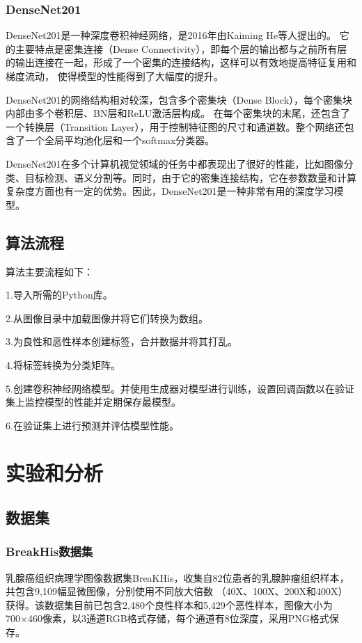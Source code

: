 \documentclass[AutoFakeBold]{LZUThesis}
\begin{document}
\subsection{DenseNet201}
DenseNet201是一种深度卷积神经网络，是2016年由Kaiming He等人提出的。
它的主要特点是密集连接（Dense Connectivity），即每个层的输出都与之前所有层的输出连接在一起，形成了一个密集的连接结构，这样可以有效地提高特征复用和梯度流动，
使得模型的性能得到了大幅度的提升。

DenseNet201的网络结构相对较深，包含多个密集块（Dense Block），每个密集块内部由多个卷积层、BN层和ReLU激活层构成。
在每个密集块的末尾，还包含了一个转换层（Transition Layer），用于控制特征图的尺寸和通道数。整个网络还包含了一个全局平均池化层和一个softmax分类器。

DenseNet201在多个计算机视觉领域的任务中都表现出了很好的性能，比如图像分类、目标检测、语义分割等。同时，由于它的密集连接结构，它在参数数量和计算复杂度方面也有一定的优势。因此，DenseNet201是一种非常有用的深度学习模型。


\section{算法流程}

算法主要流程如下：

1.导入所需的Python库。

2.从图像目录中加载图像并将它们转换为数组。

3.为良性和恶性样本创建标签，合并数据并将其打乱。

4.将标签转换为分类矩阵。

5.创建卷积神经网络模型。并使用生成器对模型进行训练，设置回调函数以在验证集上监控模型的性能并定期保存最模型。

6.在验证集上进行预测并评估模型性能。

\chapter{实验和分析}
\section{数据集}
\subsection{BreakHis数据集}
乳腺癌组织病理学图像数据集BreaKHis，收集自82位患者的乳腺肿瘤组织样本，共包含9,109幅显微图像，分别使用不同放大倍数
（40X、100X、200X和400X）获得。该数据集目前已包含2,480个良性样本和5,429个恶性样本，图像大小为700×460像素，以3通道RGB格式存储，每个通道有8位深度，采用PNG格式保存。
\end{document}
